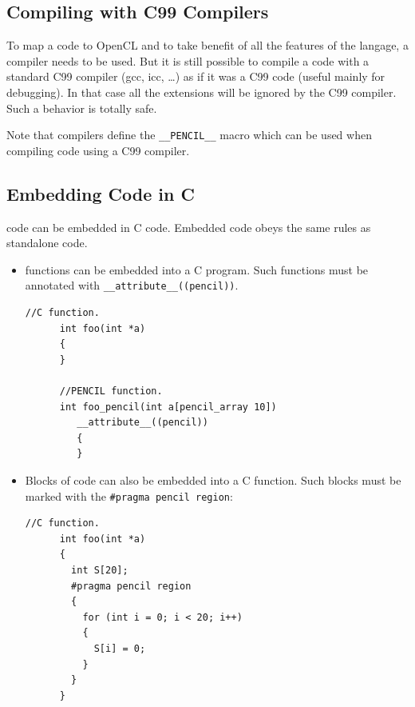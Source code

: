 \subsection{Compiling \pencil with C99 Compilers}

To map a \pencil code to OpenCL and to take benefit of all the features
of the \pencil langage, a \pencil compiler needs to be used.
But it is still possible to compile a \pencil code with a standard C99
compiler (gcc, icc, \dots) as if it was a C99 code (useful mainly for
debugging).
In that case all the \pencil extensions will be ignored by the C99
compiler.  Such a behavior is totally safe.

Note that \pencil compilers define the \lstinline!__PENCIL__! macro
which can be used when compiling \pencil code using a C99 compiler.


\subsection{Embedding \pencil Code in C}
\label{sec:pencil-as-c-ext}

\pencil code can be embedded in C code.
Embedded \pencil code obeys the same rules as standalone \pencil code.

\begin{itemize}
  \item \pencil functions can be embedded into a C program.
    Such functions must be annotated with \lstinline!__attribute__((pencil))!.
    \begin{lstlisting}[language=pencil]
      //C function.
      int foo(int *a)
      {
      }

      //PENCIL function.
      int foo_pencil(int a[pencil_array 10])
         __attribute__((pencil))
         {
         }
       \end{lstlisting}

  \item Blocks of \pencil code can also be embedded into a C function.
    Such blocks must be marked with the \lstinline!#pragma pencil region!:
    \begin{lstlisting}[language=pencil]
      //C function.
      int foo(int *a)
      {
        int S[20];
        #pragma pencil region
        {
          for (int i = 0; i < 20; i++)
          {
            S[i] = 0;
          }
        }
      }
    \end{lstlisting}
\end{itemize}



